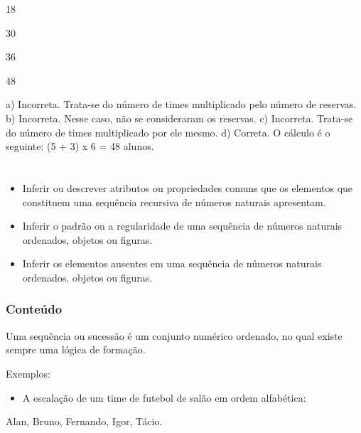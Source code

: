 \begin{escolha}
\begin{escolha}

\item
  18
\item
  30
\item
  36
\item
  48
\end{escolha}

a) Incorreta. Trata-se do número de times multiplicado pelo número de reservas.
b) Incorreta. Nesse caso, não se consideraram os reservas.
c) Incorreta. Trata-se do número de times multiplicado por ele mesmo.
d) Correta. O cálculo é o seguinte: (5 + 3) x 6 = 48 alunos.

\chapter{}


\begin{itemize}
    \item Inferir ou descrever atributos ou propriedades comuns que os elementos
que constituem uma sequência recursiva de números naturais apresentam.

    \item Inferir o padrão ou a regularidade de uma sequência de números
naturais ordenados, objetos ou figuras.

    \item Inferir os elementos ausentes em uma sequência de números naturais
ordenados, objetos ou figuras.
\end{itemize}


\subsection{Conteúdo}\label{conteuxfado-2}

Uma sequência ou sucessão é um conjunto numérico ordenado, no qual existe sempre uma lógica de formação.

Exemplos:

\begin{itemize}
\item
  A escalação de um time de futebol de salão em ordem alfabética:
\end{itemize}

Alan, Bruno, Fernando, Igor, Tácio.


\end{escolha}
